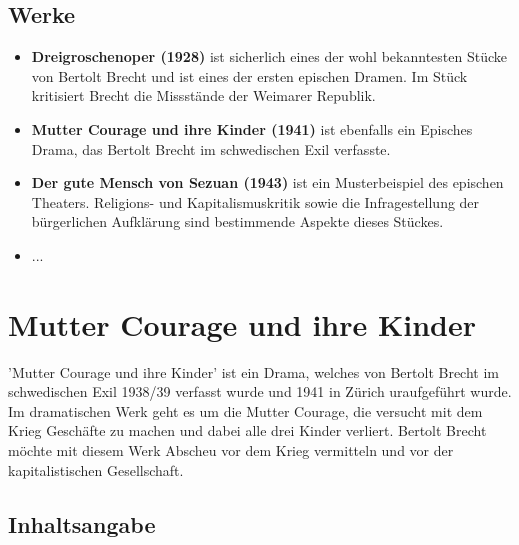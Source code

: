 \documentclass[a4paper]{article}
\begin{document}
	\subsection{Werke}

        \begin{itemize}
        \item \textbf{Dreigroschenoper (1928)} ist sicherlich eines der wohl bekanntesten Stücke von Bertolt Brecht und ist eines der ersten epischen Dramen. Im Stück kritisiert Brecht die Missstände der Weimarer Republik.
        \item \textbf{Mutter Courage und ihre Kinder (1941)} ist ebenfalls ein Episches Drama, das Bertolt Brecht im schwedischen Exil verfasste.
        \item \textbf{Der gute Mensch von Sezuan (1943)} ist ein Musterbeispiel des epischen Theaters. Religions- und Kapitalismuskritik sowie die Infragestellung der bürgerlichen Aufklärung sind bestimmende Aspekte dieses Stückes.
        \item ...
        \end{itemize}
        
        \section{Mutter Courage und ihre Kinder}

	'Mutter Courage und ihre Kinder' ist ein Drama, welches von Bertolt Brecht im schwedischen Exil 1938/39 verfasst wurde und 1941 in Zürich uraufgeführt wurde. Im dramatischen Werk geht es um die Mutter Courage, die versucht mit dem Krieg Geschäfte zu machen und dabei alle drei Kinder verliert. Bertolt Brecht möchte mit diesem Werk Abscheu vor dem Krieg vermitteln und vor der kapitalistischen Gesellschaft.
        
	\subsection{Inhaltsangabe}        
\end{document}
